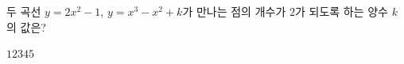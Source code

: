 두 곡선 $y=2x^2-1$, $y=x^3-x^2+k$가 만나는 점의 개수가 $2$가 되도록 하는 양수 $k$의 값은?
\begin{choices32}{$1$}{$2$}{$3$}{$4$}{$5$}\end{choices32}
